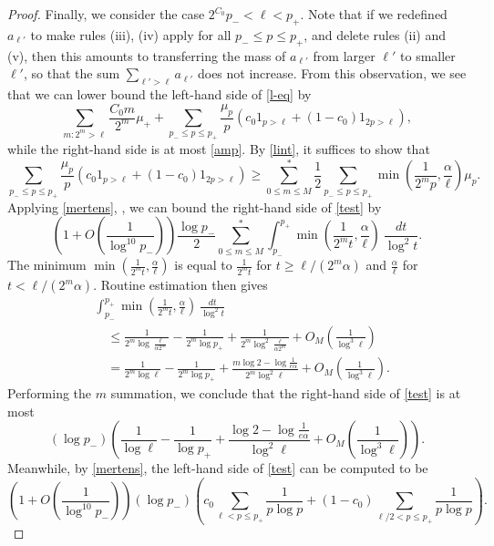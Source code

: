 \documentclass[12pt,a4paper,reqno]{amsart}
\numberwithin{equation}{section}
\theoremstyle{plain}
\theoremstyle{definition}
\begin{document}
\begin{proof}
Finally, we consider the case $2^{C_0} p_- < \ell < p_+$.  
Note that if we redefined $a_{\ell'}$ to make rules (iii), (iv) apply for all $p_- \leq p \leq p_+$, and delete rules (ii) and (v), then this amounts to transferring the mass of $a_{\ell'}$ from larger $\ell'$ to smaller $\ell'$, so that the sum $\sum_{\ell' > \ell} a_{\ell'}$ does not increase.  From this observation, we see that we can lower bound the left-hand side of \eqref{l-eq} by
$$
\sum_{m: 2^m > \ell} \frac{C_0 m}{2^m} \mu_+ + \sum_{p_- \leq p \leq p_+} \frac{\mu_p}{p} \left( c_0 1_{p>\ell} + (1-c_0) 1_{2p>\ell}\right),
$$
while the right-hand side is at most \eqref{amp}.  By \eqref{lint}, it suffices to show that
\begin{equation}\label{test}
\sum_{p_- \leq p \leq p_+} \frac{\mu_p}{p} \left( c_0 1_{p>\ell} + (1-c_0) 1_{2p>\ell}\right)
\geq
\sum_{0 \leq m \leq M}^* \frac{1}{2} \sum_{p_- \leq p \leq p_+} \min\left(\frac{1}{2^mp}, \frac{\alpha}{\ell}\right) \mu_p.
\end{equation}
Applying \eqref{mertens}, , we can bound the right-hand side of \eqref{test} by
$$ \left( 1 + O\left(\frac{1}{\log^{10} p_-}\right)\right) \frac{\log p_-}{2} \sum_{0 \leq m \leq M}^* \int_{p_-}^{p_+} \min\left(\frac{1}{2^m t}, \frac{\alpha}{\ell}\right)\ \frac{dt}{\log^2 t}.$$
The minimum $\min(\frac{1}{2^m t}, \frac{\alpha}{\ell})$ is equal to $\frac{1}{2^m t}$ for $t \geq \ell/(2^m \alpha)$ and $\frac{\alpha}{\ell}$ for $t < \ell/(2^m \alpha)$.  Routine estimation then gives
\begin{align*}
&\int_{p_-}^{p_+} \min(\frac{1}{2^m t}, \frac{\alpha}{\ell})\ \frac{dt}{\log^2 t}\\
&\quad \leq \frac{1}{2^m \log \frac{\ell}{\alpha 2^m}} - \frac{1}{2^m \log p_+} + \frac{1}{2^m \log^2 \frac{\ell}{\alpha 2^m}} + O_M\left( \frac{1}{\log^3 \ell}\right) \\
&\quad =  \frac{1}{2^m \log \ell} - \frac{1}{2^m \log p_+} + \frac{m \log 2 - \log \frac{1}{e\alpha}}{2^m \log^2 \ell} + O_M\left( \frac{1}{\log^3 \ell}\right).
\end{align*}
Performing the $m$ summation, we conclude that the right-hand side of \eqref{test} is at most
$$ (\log p_-) \left(\frac{1}{\log \ell} - \frac{1}{\log p_+} + \frac{\log 2 - \log \frac{1}{e\alpha}}{\log^2 \ell} + O_M\left( \frac{1}{\log^3 \ell}\right) \right).$$
Meanwhile, by \eqref{mertens}, the left-hand side of \eqref{test} can be computed to be
$$
\left( 1 + O\left(\frac{1}{\log^{10} p_-}\right)\right)
(\log p_-) \left( c_0 \sum_{\ell < p \leq p_+} \frac{1}{p \log p} + (1-c_0) \sum_{\ell/2 < p \leq p_+} \frac{1}{p \log p} \right).$$

\end{proof}
\end{document}
